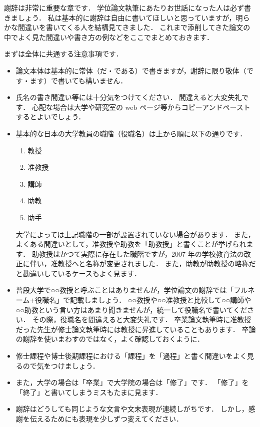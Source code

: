 \acknowledge

謝辞は非常に重要な章です．
学位論文執筆にあたりお世話になった人は必ず書きましょう．
私は基本的に謝辞は自由に書いてほしいと思っていますが，明らかな間違いを書いてくる人を結構見てきました．
これまで添削してきた論文の中でよく見た間違いや書き方の例などをここでまとめておきます．

まずは全体に共通する注意事項です．
\begin{itemize}
    \item 論文本体は基本的に常体（だ・である）で書きますが，謝辞に限り敬体（です・ます）で書いても構いません．
    \item 氏名の書き間違い等には十分気をつけてください．
    間違えると大変失礼です．
    心配な場合は大学や研究室の web ページ等からコピーアンドペーストするとよいでしょう．
    \item 基本的な日本の大学教員の職階（役職名）は上から順に以下の通りです．
    \begin{enumerate}
        \item 教授
        \item 准教授
        \item 講師
        \item 助教
        \item 助手
    \end{enumerate}
    大学によっては上記職階の一部が設置されていない場合があります．
    また，よくある間違いとして，准教授や助教を「助教授」と書くことが挙げられます．
    助教授はかつて実際に存在した職階ですが，2007 年の学校教育法の改正に伴い，准教授へと名称が変更されました．
    また，助教が助教授の略称だと勘違いしているケースもよく見ます．
    \item 普段大学で○○教授と呼ぶことはありませんが，学位論文の謝辞では「フルネーム$+$役職名」で記載しましょう．
    ○○教授や○○准教授と比較して○○講師や○○助教という言い方はあまり聞きませんが，統一して役職名で書いてください．
    その際，役職名を間違えると大変失礼です．
    卒業論文執筆時に准教授だった先生が修士論文執筆時には教授に昇進していることもあります．
    卒論の謝辞を使いまわすのではなく，よく確認しておくように．
    \item 修士課程や博士後期課程における「課程」を「過程」と書く間違いをよく見るので気をつけましょう．
    \item また，大学の場合は「卒業」で大学院の場合は「修了」です．
    「修了」を「終了」と書いてしまうミスもたまに見ます．
    \item 謝辞はどうしても同じような文言や文末表現が連続しがちです．
    しかし，感謝を伝えるためにも表現を少しずつ変えてください．
\end{itemize}

